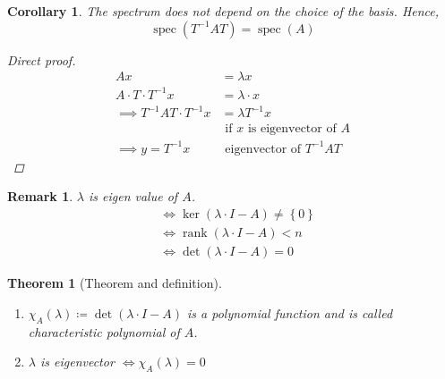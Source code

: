 \documentclass{article}
\newtheorem{theorem}{Theorem}  \numberwithin{theorem}{section}
\newtheorem{remark}{Remark}  \numberwithin{remark}{section}
\newtheorem*{corollary}{Corollary}%
\newcommand{\set}[1]{\left\{#1\right\}}
\DeclareMathOperator{\rank}{rank}
\begin{document}
\begin{corollary}
  The spectrum does not depend on the choice of the basis. Hence,
  \[ \operatorname{spec}(T^{-1} AT) = \operatorname{spec}(A) \]

  \begin{proof}[Direct proof]
    \begin{align*}
      Ax &= \lambda x \\
      A \cdot T \cdot T^{-1} x &= \lambda \cdot x \\
      \implies T^{-1} AT \cdot T^{-1} x &= \lambda T^{-1} x \\
        &\text{ if } x \text{ is eigenvector of } A \\
      \implies y = T^{-1} x &\text{ eigenvector of } T^{-1} AT
    \end{align*}
  \end{proof}
\end{corollary}

\begin{remark}
  $\lambda$ is eigen value of $A$.
  \begin{align*}
    &\iff \ker(\lambda \cdot I - A) \neq \set{0} \\
    &\iff \rank(\lambda \cdot I - A) < n \\
    &\iff \det(\lambda \cdot I - A) = 0
  \end{align*}
\end{remark}

\begin{theorem}[Theorem and definition] \hfill{} %
  \begin{enumerate}
    \item $\chi_A(\lambda) \coloneqq \det(\lambda \cdot I - A)$ is a polynomial function and is called \emph{characteristic polynomial of $A$}.
    \item $\lambda$ is eigenvector $\iff \chi_A(\lambda) = 0$
  \end{enumerate}
\end{theorem}
\end{document}
